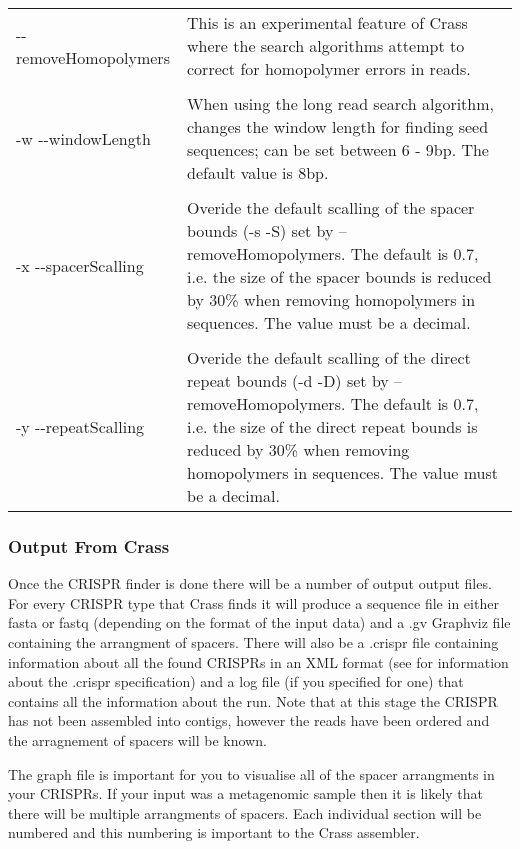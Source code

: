 \documentclass[11pt]{article} %
\begin{document}
\begin{longtable}{  l   p{10cm} }
-{}-removeHomopolymers & This is an experimental feature of Crass where the search algorithms attempt to correct for homopolymer errors in reads.\\ \\ 
-w -{}-windowLength & When using the long read search algorithm, changes the window length for finding seed sequences; can be set between 6 - 9bp.  The default value is 8bp.\\ \\ 
-x -{}-spacerScalling & Overide the default scalling of the spacer bounds (-s -S) set by --removeHomopolymers.  The default is 0.7, i.e. the size of the spacer bounds is reduced by 30\% when removing homopolymers in sequences.  The value must be a decimal.   \\ \\
-y -{}-repeatScalling & Overide the default scalling of the direct repeat bounds (-d -D) set by --removeHomopolymers.  The default is 0.7, i.e. the size of the direct repeat bounds is reduced by 30\% when removing homopolymers in sequences.  The value must be a decimal.\\ 
\hline
    \end{longtable}
\subsubsection{Output From Crass}
Once the CRISPR finder is done there will be a number of output output files.  For every CRISPR type that Crass finds it will produce a sequence file in either fasta or fastq (depending on the format of the input data) and a .gv Graphviz file containing the arrangment of spacers.  There will also be a .crispr file containing information about all the found CRISPRs in an XML format (see  for information about the .crispr specification) and a log file (if you specified for one) that contains all the information about the run. Note that at this stage the CRISPR has not been assembled into contigs, however the reads have been ordered and the arragnement of spacers will be known.

The graph file is important for you to visualise all of the spacer arrangments in your CRISPRs.  If your input was a metagenomic sample then it is likely that there will be multiple arrangments of spacers.  Each individual section will be numbered and this numbering is important to the Crass assembler.   
\end{document}
